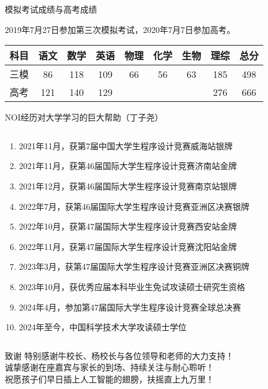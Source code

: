 \documentclass{beamer}
\begin{document}
\begin{frame}[t]{模拟考试成绩与高考成绩}
\vspace*{1cm}
\centering
\begin{spacing}{1.5}
\large
2019年7月27日参加第三次模拟考试，2020年7月7日参加高考。\\
\vspace{2cm}
\begin{tabular}{|c|c|c|c|c|c|c|c|c|}
\hline
科目 & 语文 & 数学 & 英语 & 物理 & 化学 & 生物 & 理综 & 总分 \\
\hline
三模 & 86 & 118 & 109 & 66 & 56 & 63 & 185 & 498 \\
\hline
高考 & 121 & 140 & 129 &  &  &  & 276 &  666\\
\hline
\end{tabular}
\end{spacing}
\end{frame}

\begin{frame}[t]{NOI经历对大学学习的巨大帮助（丁子尧）}
\begin{columns}
\begin{spacing}{1.1}
\large
    \begin{enumerate}[label={\arabic*.}]
    \item 2021年11月，获第7届中国大学生程序设计竞赛威海站银牌
	\item 2021年11月，获第46届国际大学生程序设计竞赛济南站金牌
	\item 2021年12月，获第46届国际大学生程序设计竞赛南京站银牌
	\item 2022年7月，获第46届国际大学生程序设计竞赛亚洲区决赛银牌
	\item 2022年10月，获第47届国际大学生程序设计竞赛西安站金牌
	\item 2022年11月，获第47届国际大学生程序设计竞赛沈阳站金牌
	\item 2023年3月，获第47届国际大学生程序设计竞赛亚洲区决赛铜牌
	\item 2023年10月，获优秀应届本科毕业生免试攻读硕士研究生资格
	\item 2024年4月，参加第47届国际大学生程序设计竞赛全球总决赛
	\item 2024年至今，中国科学技术大学攻读硕士学位
\end{enumerate}
\end{spacing} 
\end{columns}
\end{frame}

\begin{frame}[t]{致谢}
\large
\centering
\vspace*{4cm}
特别感谢牛校长、杨校长与各位领导和老师的大力支持！\\
\vspace*{1cm}
诚挚感谢在座嘉宾与家长的到场、持续关注与耐心聆听！\\
\vspace*{1cm}
祝愿孩子们早日插上人工智能的翅膀，扶摇直上九万里！
\end{frame}
\end{document}
